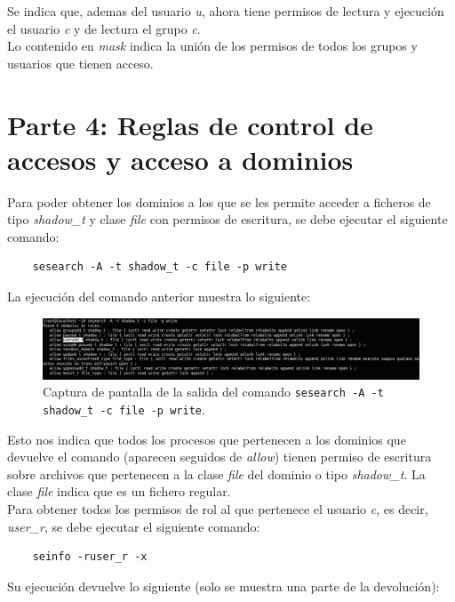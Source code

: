 \documentclass[10pt,a4paper]{article}
\begin{document}
Se indica que, ademas del usuario \textit{u}, ahora tiene permisos de lectura y ejecución el usuario \textit{c} y de lectura el grupo \textit{c}.\\
Lo contenido en \textit{mask} indica la unión de los permisos de todos los grupos y usuarios que tienen acceso. 

\newpage
\section{Parte 4: Reglas de control de accesos y acceso a dominios}

Para poder obtener los dominios a los que se les permite acceder a ficheros de tipo \textit{shadow\_t} y clase \textit{file} con permisos de escritura, se debe ejecutar el siguiente comando: 

\begin{lstlisting}
	sesearch -A -t shadow_t -c file -p write
\end{lstlisting}
La ejecución del comando anterior muestra lo siguiente: 

\begin{figure}[h!]
	\centering
	\includegraphics[scale=0.5]{images/parte4_15.png}
	\caption{Captura de pantalla de la salida del comando \texttt{sesearch -A -t shadow\_t -c file -p write}.}
	\label{fig:parte4_15}
\end{figure}

Esto nos indica que todos los procesos que pertenecen a los dominios que devuelve el comando (aparecen seguidos de \textit{allow}) tienen permiso de escritura sobre archivos que pertenecen a la clase \textit{file} del dominio o tipo \textit{shadow\_t}. La clase \textit{file} indica que es un fichero regular.\\

Para obtener todos los permisos de rol al que pertenece el usuario \textit{c}, es decir, \textit{user\_r}, se debe ejecutar el siguiente comando: 
\begin{lstlisting}
	seinfo -ruser_r -x
\end{lstlisting}  

Su ejecución devuelve lo siguiente (solo se muestra una parte de la devolución): 
\end{document}
